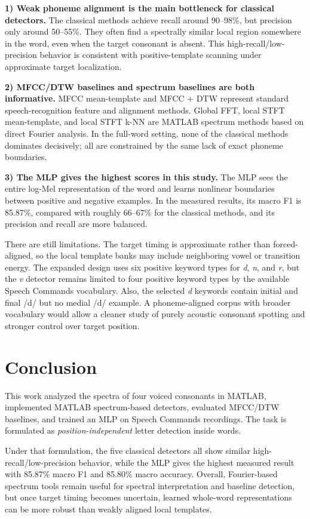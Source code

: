\documentclass[conference]{IEEEtran}
\begin{document}
\textbf{1) Weak phoneme alignment is the main bottleneck for classical detectors.}
The classical methods achieve recall around 90--98\%, but precision only around 50--55\%. They often find a spectrally similar local region somewhere in the word, even when the target consonant is absent. This high-recall/low-precision behavior is consistent with positive-template scanning under approximate target localization.

\textbf{2) MFCC/DTW baselines and spectrum baselines are both informative.}
MFCC mean-template and MFCC + DTW represent standard speech-recognition feature and alignment methods. Global FFT, local STFT mean-template, and local STFT k-NN are MATLAB spectrum methods based on direct Fourier analysis. In the full-word setting, none of the classical methods dominates decisively; all are constrained by the same lack of exact phoneme boundaries.

\textbf{3) The MLP gives the highest scores in this study.}
The MLP sees the entire log-Mel representation of the word and learns nonlinear boundaries between positive and negative examples. In the measured results, its macro F1 is 85.87\%, compared with roughly 66--67\% for the classical methods, and its precision and recall are more balanced.

There are still limitations. The target timing is approximate rather than forced-aligned, so the local template banks may include neighboring vowel or transition energy. The expanded design uses six positive keyword types for \textit{d}, \textit{n}, and \textit{r}, but the \textit{v} detector remains limited to four positive keyword types by the available Speech Commands vocabulary. Also, the selected \textit{d} keywords contain initial and final /d/ but no medial /d/ example. A phoneme-aligned corpus with broader vocabulary would allow a cleaner study of purely acoustic consonant spotting and stronger control over target position.

\section{Conclusion}
This work analyzed the spectra of four voiced consonants in MATLAB, implemented MATLAB spectrum-based detectors, evaluated MFCC/DTW baselines, and trained an MLP on Speech Commands recordings. The task is formulated as \emph{position-independent} letter detection inside words.

Under that formulation, the five classical detectors all show similar high-recall/low-precision behavior, while the MLP gives the highest measured result with 85.87\% macro F1 and 85.80\% macro accuracy. Overall, Fourier-based spectrum tools remain useful for spectral interpretation and baseline detection, but once target timing becomes uncertain, learned whole-word representations can be more robust than weakly aligned local templates.



\end{document}

